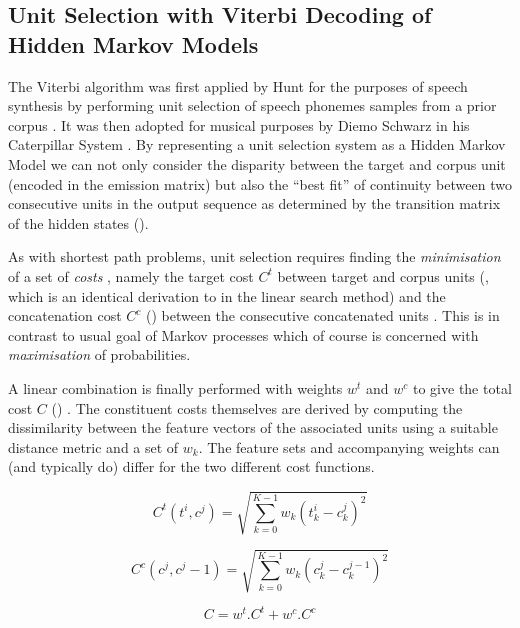 {{{{{{{\subsection{Unit Selection with Viterbi Decoding of Hidden Markov Models}
\label{viterbi_unit_selection}

The Viterbi algorithm was first applied by Hunt for the purposes of speech synthesis by performing unit selection of speech phonemes samples from a prior corpus \citep{Hunt1996}. It was then adopted for musical purposes by Diemo Schwarz in his Caterpillar System \citep{Schwarz2003}. By representing a unit selection system as a Hidden Markov Model we can not only consider the disparity between the target and corpus unit (encoded in the emission matrix) but also the “best fit” of continuity between two consecutive units in the output sequence as determined by the transition matrix of the hidden states ().

As with shortest path problems, unit selection requires finding the \textit{minimisation} of a set of \textit{costs} \citep{Hunt1996}, namely the target cost $C^{t}$ between target and corpus units (, which is an identical derivation to  in the linear search method) and the concatenation cost $C^{c}$ () between the consecutive concatenated units \citep{Schwarz2003}. This is in contrast to usual goal of Markov processes which of course is concerned with \textit{maximisation} of probabilities. 

A linear combination is finally performed with weights $w^{t}$ and $w^{c}$ to give the total cost $C$ () . The constituent costs themselves are derived by computing the dissimilarity between the feature vectors of the associated units using a suitable distance metric and a set of $w_k$. The feature sets and accompanying weights can (and typically do) differ for the two different cost functions. 

\begin{equation}
\label{eq:target_cost}
C^{t}(t^i, c^j) = \sqrt{\sum_{k=0}^{K-1}w_k(t^i_k-c^j_k)^2}
\end{equation}

\begin{equation}
\label{eq:concatenation_cost}
C^{c}(c^j, c^j-1) = \sqrt{\sum_{k=0}^{K-1}w_k(c^j_k-c^{j-1}_k)^2}
\end{equation}

\begin{equation}
\label{eq:total_cost}
C = w^t.C^t + w^c.C^c
\end{equation}

}}}}}}}
